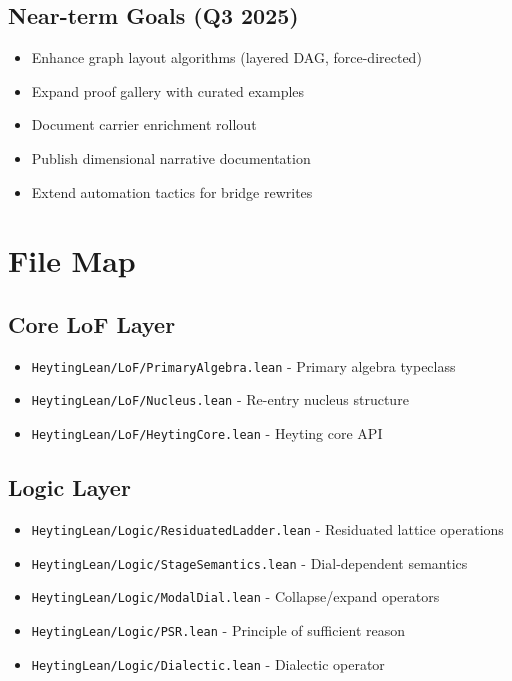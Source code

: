 \documentclass{amsart}
\theoremstyle{definition}
\theoremstyle{remark}
\begin{document}
\subsection{Near-term Goals (Q3 2025)}

\begin{itemize}
\item Enhance graph layout algorithms (layered DAG, force-directed)
\item Expand proof gallery with curated examples
\item Document carrier enrichment rollout
\item Publish dimensional narrative documentation
\item Extend automation tactics for bridge rewrites
\end{itemize}

\section{File Map}

\subsection{Core LoF Layer}
\begin{itemize}
\item \texttt{HeytingLean/LoF/PrimaryAlgebra.lean} - Primary algebra typeclass
\item \texttt{HeytingLean/LoF/Nucleus.lean} - Re-entry nucleus structure
\item \texttt{HeytingLean/LoF/HeytingCore.lean} - Heyting core API
\end{itemize}

\subsection{Logic Layer}
\begin{itemize}
\item \texttt{HeytingLean/Logic/ResiduatedLadder.lean} - Residuated lattice operations
\item \texttt{HeytingLean/Logic/StageSemantics.lean} - Dial-dependent semantics
\item \texttt{HeytingLean/Logic/ModalDial.lean} - Collapse/expand operators
\item \texttt{HeytingLean/Logic/PSR.lean} - Principle of sufficient reason
\item \texttt{HeytingLean/Logic/Dialectic.lean} - Dialectic operator
\end{itemize}
\end{document}
